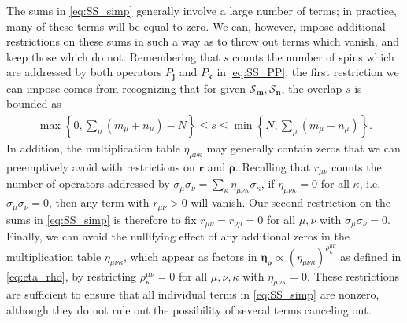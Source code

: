 \documentclass[aps,notitlepage,nofootinbib,11pt]{revtex4-1}
\newcommand{\p}[1]{\left(#1\right)} %
\renewcommand{\set}[1]{\left\{#1\right\}} %
\renewcommand{\v}{\bm} %
\renewcommand{\S}{\mathcal{S}}
\newcommand{\1}{\mathds{1}}
\begin{document}
The sums in \eqref{eq:SS_simp} generally involve a large number of
terms; in practice, many of these terms will be equal to zero.  We
can, however, impose additional restrictions on these sums in such a
way as to throw out terms which vanish, and keep those which do not.
Remembering that $s$ counts the number of spins which are addressed by
both operators $P_{\v j}$ and $P_{\v k}$ in \eqref{eq:SS_PP}, the
first restriction we can impose comes from recognizing that for given
$\S_{\v m},\S_{\v n}$, the overlap $s$ is bounded as
\begin{align}
  \max\set{0,\sum_\mu\p{m_\mu+n_\mu}-N}
  \le s \le \min\set{N,\sum_\mu\p{m_\mu+n_\mu}}.
\end{align}
In addition, the multiplication table $\eta_{\mu\nu\kappa}$ may
generally contain zeros that we can preemptively avoid with
restrictions on $\v r$ and $\v\rho$.  Recalling that $r_{\mu\nu}$
counts the number of operators addressed by
$\sigma_\mu\sigma_\nu=\sum_\kappa\eta_{\mu\nu\kappa}\sigma_\kappa$, if
$\eta_{\mu\nu\kappa}=0$ for all $\kappa$,
i.e.~$\sigma_\mu\sigma_\nu=0$, then any term with $r_{\mu\nu}>0$ will
vanish.  Our second restriction on the sums in \eqref{eq:SS_simp} is
therefore to fix $r_{\mu\nu}=r_{\nu\mu}=0$ for all $\mu,\nu$ with
$\sigma_\mu\sigma_\nu=0$.  Finally, we can avoid the nullifying effect
of any additional zeros in the multiplication table
$\eta_{\mu\nu\kappa}$, which appear as factors in
$\v\eta_{\v\rho}\propto\p{\eta_{\mu\nu\kappa}}^{\rho^{\mu\nu}_\kappa}$
as defined in \eqref{eq:eta_rho}, by restricting
$\rho^{\mu\nu}_\kappa=0$ for all $\mu,\nu,\kappa$ with
$\eta_{\mu\nu\kappa}=0$.  These restrictions are sufficient to ensure
that all individual terms in \eqref{eq:SS_simp} are nonzero, although
they do not rule out the possibility of several terms canceling out.
\end{document}
